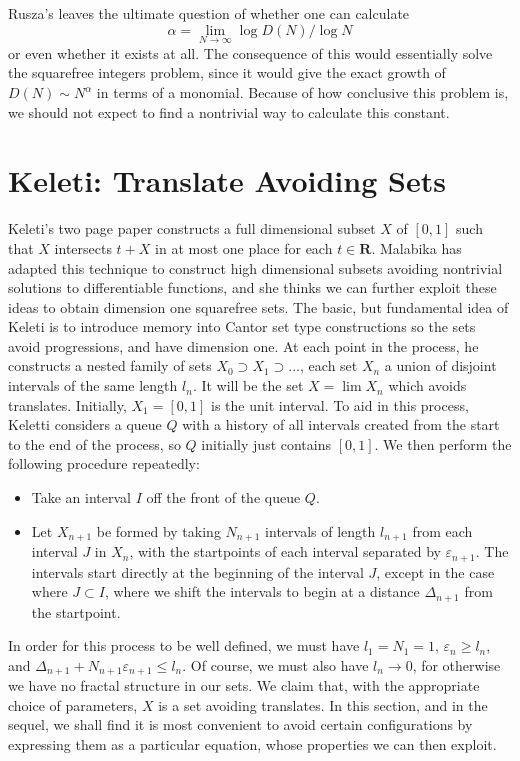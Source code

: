 \documentclass{report}
\theoremstyle{plain}
\theoremstyle{plain}
\begin{document}
Rusza's leaves the ultimate question of whether one can calculate
%
\[ \alpha = \lim_{N \to \infty} \log D(N) / \log N \]
%
or even whether it exists at all. The consequence of this would essentially solve the squarefree integers problem, since it would give the exact growth of $D(N) \sim N^\alpha$ in terms of a monomial. Because of how conclusive this problem is, we should not expect to find a nontrivial way to calculate this constant.











\section{Keleti: Translate Avoiding Sets}

Keleti's two page paper constructs a full dimensional subset $X$ of $[0,1]$ such that $X$ intersects $t + X$ in at most one place for each $t \in \mathbf{R}$. Malabika has adapted this technique to construct high dimensional subsets avoiding nontrivial solutions to differentiable functions, and she thinks we can further exploit these ideas to obtain dimension one squarefree sets. The basic, but fundamental idea of Keleti is to introduce memory into Cantor set type constructions so the sets avoid progressions, and have dimension one. At each point in the process, he constructs a nested family of sets $X_0 \supset X_1 \supset \dots$, each set $X_n$ a union of disjoint intervals of the same length $l_n$. It will be the set $X = \lim X_n$ which avoids translates. Initially, $X_1 = [0,1]$ is the unit interval. To aid in this process, Keletti considers a queue $Q$ with a history of all intervals created from the start to the end of the process, so $Q$ initially just contains $[0,1]$. We then perform the following procedure repeatedly:
%
\begin{itemize}
    \item Take an interval $I$ off the front of the queue $Q$.

    \item Let $X_{n+1}$ be formed by taking $N_{n+1}$ intervals of length $l_{n+1}$ from each interval $J$ in $X_n$, with the startpoints of each interval separated by $\varepsilon_{n+1}$. The intervals start directly at the beginning of the interval $J$, except in the case where $J \subset I$, where we shift the intervals to begin at a distance $\Delta_{n+1}$ from the startpoint.
\end{itemize}
%
In order for this process to be well defined, we must have $l_1 = N_1 = 1$, $\varepsilon_n \geq l_n$, and $\Delta_{n+1} + N_{n+1} \varepsilon_{n+1} \leq l_n$. Of course, we must also have $l_n \to 0$, for otherwise we have no fractal structure in our sets. We claim that, with the appropriate choice of parameters, $X$ is a set avoiding translates. In this section, and in the sequel, we shall find it is most convenient to avoid certain configurations by expressing them as a particular equation, whose properties we can then exploit.
\end{document}
